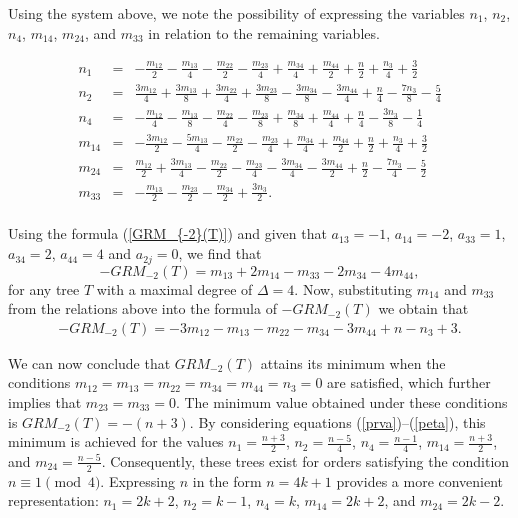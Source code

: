 \documentclass[preprint,12pt]{elsarticle}
\begin{document}
Using the system above, we note the possibility of expressing the variables $n_1$, $n_2$, $n_4$, $m_{14}$, $m_{24}$, and $m_{33}$ in relation to the remaining variables.

\begin{eqnarray}
    n_1 &=& -\frac{m_{12}}{2} - \frac{m_{13}}{4} - \frac{m_{22}}{2} - \frac{m_{23}}{4} +\frac{m_{34}}{4} + \frac{m_{44}}{2} + \frac{n}{2} + \frac{n_3}{4} + \frac{3}{2}\label{prva}\\
    n_2 &=& \frac{3m_{12}}{4} + \frac{3m_{13}}{8} + \frac{3m_{22}}{4} + \frac{3m_{23}}{8} - \frac{3m_{34}}{8} - \frac{3m_{44}}{4} + \frac{n}{4} - \frac{7n_3}{8} - \frac{5}{4}\label{druga}\\
    n_4 &=& -\frac{m_{12}}{4} - \frac{m_{13}}{8} - \frac{m_{22}}{4} - \frac{m_{23}}{8} + \frac{m_{34}}{8} + \frac{m_{44}}{4} + \frac{n}{4} - \frac{3n_3}{8} - \frac{1}{4}\\
    m_{14}&=&-\frac{3m_{12}}{2} - \frac{5m_{13}}{4} - \frac{m_{22}}{2} - \frac{m_{23}}{4} + \frac{m_{34}}{4} + \frac{m_{44}}{2} + \frac{n}{2} + \frac{n_3}{4} + \frac{3}{2} \\
    m_{24}&=&\frac{m_{12}}{2} + \frac{3m_{13}}{4} - \frac{m_{22}}{2} - \frac{m_{23}}{4} - \frac{3m_{34}}{4} - \frac{3m_{44}}{2} + \frac{n}{2} - \frac{7n_3}{4} - \frac{5}{2}\label{peta} \\
     m_{33}&=&-\frac{m_{13}}{2}- \frac{m_{23}}{2}-\frac{m_{34}}{2}+\frac{3n_3}{2}.\label{sesta}\\ \nonumber
\end{eqnarray}

Using the formula (\ref{GRM_{-2}(T)}) and given that  $a_{13} = -1$, $a_{14}=-2$, $a_{33} = 1$, $a_{34} = 2$, $a_{44} = 4$ and $a_{2j}=0$, we find that 
$$
-GRM_{-2}(T)= m_{13}+2m_{14}-m_{33}-2m_{34}-4m_{44},
$$
for any tree $T$ with a maximal degree of $\Delta=4$. Now, substituting $m_{14}$ and $m_{33}$ from the relations above into the formula of $-GRM_{-2}(T)$ we obtain that
\begin{eqnarray}
\label{main2}
-GRM_{-2}(T)=-3m_{12}- m_{13}-m_{22}-m_{34}-3m_{44}+n-n_3+3.
\end{eqnarray}


We can now conclude that $GRM_{-2}(T)$ attains its minimum when the conditions $m_{12}=m_{13}=m_{22}=m_{34}=m_{44}=n_3=0$ are satisfied, which further implies that $m_{23}=m_{33}=0$. The minimum value obtained under these conditions is $GRM_{-2}(T)=-(n+3)$.
By considering equations (\ref{prva})–(\ref{peta}), this minimum is achieved for the values $n_1=\frac{n+3}{2}$, $n_2=\frac{n-5}{4}$, $n_4=\frac{n-1}{4}$, $m_{14}=\frac{n+3}{2}$, and $m_{24}=\frac{n-5}{2}$. Consequently, these trees exist for orders satisfying the condition $n\equiv 1 \pmod 4$. Expressing $n$ in the form $n=4k+1$ provides a more convenient representation: $n_1=2k+2$, $n_2=k-1$, $n_4=k$, $m_{14}=2k+2$, and $m_{24}=2k-2$.
\end{document}
